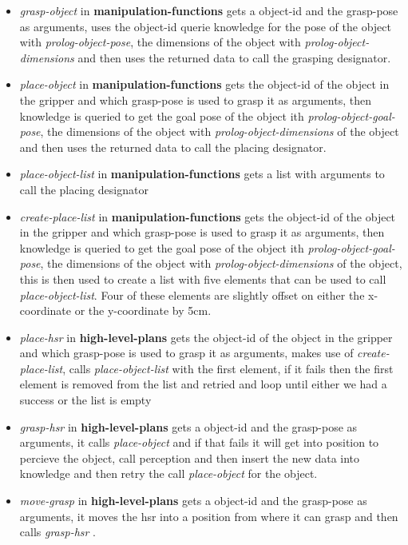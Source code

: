 \documentclass[main.tex]{subfiles}
\begin{document}
                                  \begin{itemize}  
                  \item \textit{grasp-object} in \textbf{manipulation-functions} gets a object-id and the grasp-pose as arguments, uses the object-id querie knowledge for the pose of the object with \textit{prolog-object-pose}, the dimensions of the object with \textit{prolog-object-dimensions} and then uses the returned data to call the grasping designator.
                  \item \textit{place-object} in \textbf{manipulation-functions} gets the object-id of the object in the gripper and which grasp-pose is used to grasp it as arguments, then knowledge is queried to get the goal pose of the object ith \textit{prolog-object-goal-pose}, the dimensions of the object with \textit{prolog-object-dimensions} of the object and then uses the returned data to call the placing designator.
                  \item \textit{place-object-list} in \textbf{manipulation-functions}
                  gets a list with arguments to call the placing designator 
                  \item \textit{create-place-list} in \textbf{manipulation-functions} 
                  gets the object-id of the object in the gripper and which grasp-pose is used to grasp it as arguments, then knowledge is queried to get the goal pose of the object ith \textit{prolog-object-goal-pose}, the dimensions of the object with \textit{prolog-object-dimensions} of the object, this is then used to create a list with five elements that can be used to call \textit{place-object-list}. Four of these elements are slightly offset on either the x-coordinate or the y-coordinate by 5cm.  
                  \item \textit{place-hsr} in \textbf{high-level-plans}  gets the object-id of the object in the gripper and which grasp-pose is used to grasp it as arguments, makes use of \textit{create-place-list}, calls \textit{place-object-list} with the first element, if it fails then the first element is removed from the list and retried and loop until either we had a success or the list is empty
                  \item \textit{grasp-hsr} in \textbf{high-level-plans} gets a object-id and the grasp-pose as arguments, it calls \textit{place-object} and if that fails it will get into position to percieve the object, call perception and then insert the new data into knowledge and then retry the call \textit{place-object} for the object.
                  \item \textit{move-grasp} in \textbf{high-level-plans} gets a object-id and the grasp-pose as arguments, it moves the hsr into a position from where it can grasp and then calls \textit{grasp-hsr }.
                  
                  \end{itemize}
\end{document}
